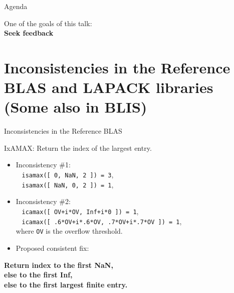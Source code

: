 \documentclass[11pt]{beamer}
\begin{document}
\begin{frame}{Agenda}

	\tableofcontents

	\begin{center}
		One of the goals of this talk:\\
		\textbf{Seek feedback}
	\end{center}

\end{frame}

\section{Inconsistencies in the Reference BLAS and LAPACK libraries (Some also in BLIS)}

\begin{frame}{Inconsistencies in the Reference BLAS}

	IxAMAX: Return the index of the largest entry.
	\begin{itemize}
		\item Inconsistency \#1:\\
		~ \texttt{isamax([ 0, NaN, 2 ]) = 3},\\
		~ \texttt{isamax([ NaN, 0, 2 ]) = 1},
		\item Inconsistency \#2:\\
		~ \texttt{icamax([ OV+i*OV, Inf+i*0 ]) = 1},\\
		~ \texttt{icamax([ .6*OV+i*.6*OV, .7*OV+i*.7*OV ]) = 1},\\
		where \texttt{OV} is the overflow threshold.
		\item Proposed consistent fix: 
	\end{itemize}

	\begin{center}
		\textbf{Return index to the first NaN,\\ else to the first Inf,\\ else to the first largest finite entry.}
	\end{center}
	


\end{frame}
\end{document}
